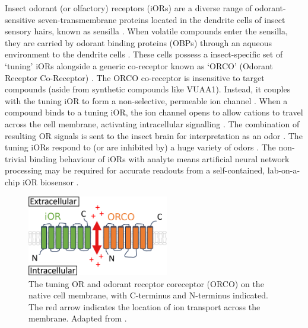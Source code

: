 \documentclass[
  a4paper,
]{scrbook}
\begin{document}
Insect odorant (or olfactory) receptors (iORs) are a diverse range of
odorant-sensitive seven-transmembrane proteins located in the dendrite
cells of insect sensory hairs, known as sensilla
\autocite{Clyne1999,Carraher2015,Brito2016,Wicher2021}. When volatile
compounds enter the sensilla, they are carried by odorant binding
proteins (OBPs) through an aqueous environment to the dendrite cells
\autocite{Carraher2015,Brito2016,Wicher2021}. These cells possess a
insect-specific set of `tuning' iORs alongside a generic co-receptor
known as `ORCO' (Odorant Receptor Co-Receptor)
\autocite{Carraher2015,Butterwick2018,Khadka2019,Wicher2021}. The ORCO
co-receptor is insensitive to target compounds (aside from synthetic
compounds like VUAA1). Instead, it couples with the tuning iOR to form a
non-selective, permeable ion channel
\autocite{Butterwick2018,Wicher2021}. When a compound binds to a tuning
iOR, the ion channel opens to allow cations to travel across the cell
membrane, activating intracellular signalling
\autocite{Smart2008,Wicher2008,Sato2008,Carraher2015,Brito2016,Butterwick2018,Wicher2021}.
The combination of resulting OR signals is sent to the insect brain for
interpretation as an odor \autocite{Hallem2004,Carraher2015,Wicher2021}.
The tuning iORs respond to (or are inhibited by) a huge variety of odors
\autocite{Munch2016}. The non-trivial binding behaviour of iORs with
analyte means artificial neural network processing may be required for
accurate readouts from a self-contained, lab-on-a-chip iOR biosensor
\autocite{Bachtiar2016}.

\begin{figure}

{\centering \includegraphics[width=0.55\textwidth,height=\textheight]{figures/ch3/OR_diagram.png}

}

\caption{\label{fig-iOR-membrane}The tuning OR and odorant receptor
coreceptor (ORCO) on the native cell membrane, with C-terminus and
N-terminus indicated. The red arrow indicates the location of ion
transport across the membrane. Adapted from
\autocite{Brito2016,Wicher2021}.}

\end{figure}
\end{document}
